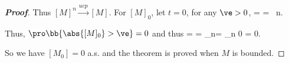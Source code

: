 \begin{proof}[\bf Proof]


Thus $[M]^n \xrightarrow{ucp} [M]$. For $[M]_0$, let $t=0$, for any $\ve>0$,
\be
\pro{} =\pro{} = \pro{} \ n\to \infty.
\ee

Thus, $\pro\bb{\abs{[M]_0}>\ve}= 0$ and thus
\be
\pro{} = \pro{} = \pro{} \leq \sum_{n\in \N}\pro{}= \sum_{n\in \N} 0 = 0.
\ee

So we have $[M_0] = 0$ a.s. and the theorem is proved when $M$ is bounded.



\end{proof}
